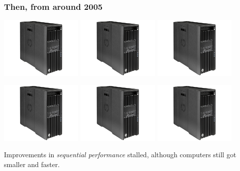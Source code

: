 \documentclass[rgb,dvipsnames]{beamer}
\begin{document}
\begin{frame}
  \frametitle{Then, from around 2005}
  \begin{center}
    \includegraphics[width=0.3\textwidth]{img/hp.jpg}
    \includegraphics[width=0.3\textwidth]{img/hp.jpg}
    \includegraphics[width=0.3\textwidth]{img/hp.jpg}

    \includegraphics[width=0.3\textwidth]{img/hp.jpg}
    \includegraphics[width=0.3\textwidth]{img/hp.jpg}
    \includegraphics[width=0.3\textwidth]{img/hp.jpg}
  \end{center}

  Improvements in \textit{sequential performance} stalled, although
  computers still got smaller and faster.
\end{frame}
\end{document}
